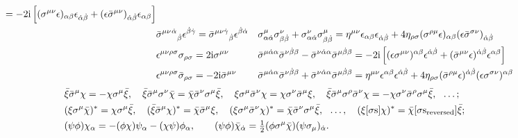 \documentclass[CheatSheet]{subfiles}
\begin{document}
\begin{align*}
    = -2\mathrm{i}\left[(\sigma^{\mu\nu}\epsilon)_{\alpha\beta}\epsilon_{{\dot\alpha}{\dot\beta}}
            +(\epsilon\bar\sigma^{\mu\nu})_{{\dot\alpha}{\dot\beta}}\epsilon_{\alpha\beta}\right]
\\
 &\bar\sigma^{\mu \nu}{}^{{\dot\alpha}}{}_{{\dot\beta}}{}\epsilon^{{\dot\beta}{\dot\gamma}}=\bar{\sigma}^{\mu \nu{\dot\gamma}}{}_{\dot\beta}\epsilon^{{\dot\beta}{\dot\alpha}}&
 &\sigma^{\mu}_{\alpha{\dot\alpha}}\sigma^{\nu}_{\beta{\dot\beta}}+\sigma^{\nu}_{\alpha{\dot\alpha}}\sigma^{\mu}_{\beta{\dot\beta}}
    = \eta^{\mu\nu}\epsilon_{\alpha\beta}\epsilon_{{\dot\alpha}{\dot\beta}}
       + 4\eta_{\rho\sigma}(\sigma^{\rho\mu}\epsilon)_{\alpha\beta}(\epsilon\bar\sigma^{\sigma\nu})_{{\dot\alpha}{\dot\beta}}&
 \\
 &\epsilon^{\mu\nu\rho\sigma}\sigma_{\rho\sigma}=2\mathrm{i}\sigma^{\mu\nu}&
 &\bar\sigma^{\mu{\dot\alpha}\alpha}\bar\sigma^{\nu{\dot\beta}\beta} - \bar\sigma^{\nu{\dot\alpha}\alpha}\bar\sigma^{\mu{\dot\beta}\beta}
  = -2\mathrm{i}\left[(\epsilon\sigma^{\mu\nu})^{\alpha\beta}\epsilon^{{\dot\alpha}{\dot\beta}} + (\bar\sigma^{\mu\nu}\epsilon)^{{\dot\alpha}{\dot\beta}}\epsilon^{\alpha\beta}\right]
 \\
 &\epsilon^{\mu\nu\rho\sigma}\bar\sigma_{\rho\sigma}=-2\mathrm{i}\bar\sigma^{\mu\nu}&
 &\bar\sigma^{\mu{\dot\alpha}\alpha}\bar\sigma^{\nu{\dot\beta}\beta} + \bar\sigma^{\nu{\dot\alpha}\alpha}\bar\sigma^{\mu{\dot\beta}\beta}
  = \eta^{\mu\nu}\epsilon^{\alpha\beta}\epsilon^{{\dot\alpha}{\dot\beta}} +  4\eta_{\rho\sigma}(\bar\sigma^{\rho\mu}\epsilon)^{{\dot\alpha}{\dot\beta}}(\epsilon\sigma^{\sigma\nu})^{\alpha\beta}
\end{align*}\vspace{-9pt}
\begin{align*}
& \bar\xi\bar\sigma^\mu\chi = -\chi\sigma^\mu\bar\xi,\quad
  \bar\xi\bar\sigma^\mu\sigma^\nu\bar\chi = \bar\chi\bar\sigma^\nu\sigma^\mu\bar\xi,\quad
  \xi\sigma^\mu\bar\sigma^\nu\chi = \chi\sigma^\nu\bar\sigma^\mu\xi,\quad
  \bar\xi\bar\sigma^\mu\sigma^\rho\bar\sigma^\nu\chi = -\chi\sigma^\nu\bar\sigma^\rho\sigma^\mu\bar\xi,~~\dots;
\\&
  (\xi\sigma^\mu\bar\chi)^* = \chi\sigma^\mu\bar\xi,\quad
  (\bar\xi\bar\sigma^\mu\chi)^* = \bar\chi\bar\sigma^\mu\xi,\quad
  (\xi\sigma^\mu\bar\sigma^\nu\chi)^* = \bar\chi\bar\sigma^\nu\sigma^\mu\bar\xi,~~\dots,\quad
  (\xi[\text{$\sigma$s}]\chi)^* = \bar\chi[\text{$\sigma$s$_\text{reversed}$}]\bar\xi;
\\&
 (\psi\phi)\chi_\alpha=-(\phi\chi)\psi_\alpha-(\chi\psi)\phi_\alpha,\qquad
 (\psi\phi)\bar\chi_{\dot\alpha}=\tfrac12(\phi\sigma^\mu\bar\chi)(\psi\sigma_\mu)_{\dot\alpha}.
\end{align*}
\end{document}
